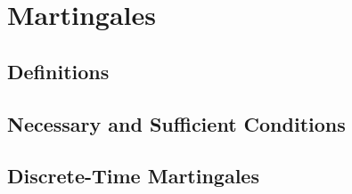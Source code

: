 
\chapter{Martingales}\label{chapter:martingales}

\section{Definitions}

\section{Necessary and Sufficient Conditions}

\section{Discrete-Time Martingales}
